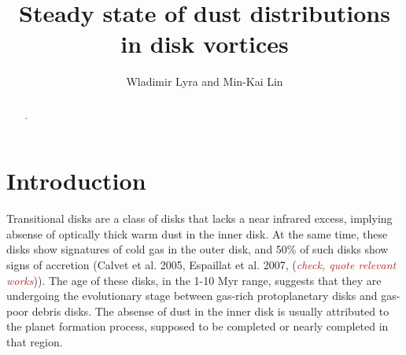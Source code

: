 \documentclass[apj]{emulateapj}
\def\brown#1{\textcolor{brown}{#1}}
\newcommand{\comm}[1]{({\it \brown{#1}})}
\begin{document}

\title{Steady state of dust distributions in disk vortices}
\author{Wladimir Lyra and Min-Kai Lin}

\begin{abstract}
.
\end{abstract}

\section{Introduction}
\label{sect:introduction}



Transitional disks are a class of disks that lacks a near infrared
excess, implying absense of optically thick warm dust in the inner
disk. At the same time, these disks show signatures of cold gas in the
outer disk, and 50\% of such disks show signs of accretion (Calvet et
al. 2005, Espaillat et al. 2007, \comm{check, quote relevant works}). 
The age of these disks, in the 1-10 Myr range, suggests that they are undergoing 
the evolutionary stage between gas-rich protoplanetary disks and gas-poor
debris disks. The absense of dust in the inner disk is usually
attributed to the planet formation process, supposed to be completed
or nearly completed in that region. 

\end{document}
